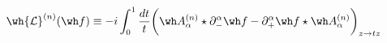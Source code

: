 \begin{equation}
\wh{\mathcal{L}}^{(n)}(\wh f) \equiv -i \int_0^1 \frac{dt}{t} \bigg( 
\wh A_\alpha^{(n)} \star \partial^\alpha_- \wh f - 
\partial^\alpha_+ \wh f \star \wh A_\alpha^{(n)} \bigg)_{z\rightarrow tz}
\end{equation}

